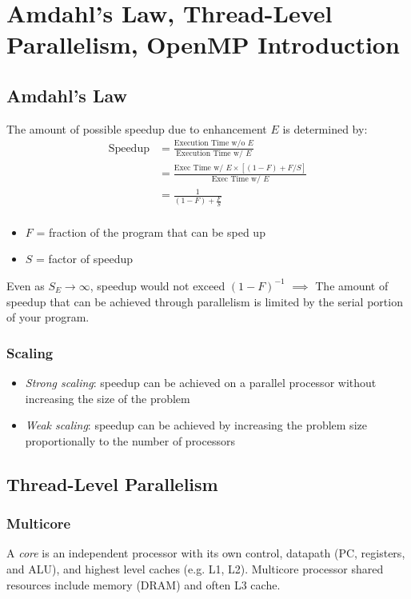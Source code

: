 \chapter{Amdahl's Law, Thread-Level Parallelism, OpenMP Introduction}

\section{Amdahl's Law}
The amount of possible speedup due to enhancement $E$ is determined by:
\begin{align*}
	\text{Speedup} &= \frac{\text{Execution Time w/o $E$}}{\text{Execution Time w/ $E$}} \\
	&= \frac{\text{Exec Time w/ $E$} \times [(1-F) + F/S]}{\text{Exec Time w/ $E$}} \\
	&= \frac{1}{(1-F) + \frac{F}{S}} \\
\end{align*}
\begin{itemize}
    \item $F$ = fraction of the program that can be sped up
    \item $S$ = factor of speedup
\end{itemize}
Even as \(S_E\to\infty\), speedup would not exceed \(\left(1 - F\right)^{-1}\) $\implies$ The amount of speedup that can be achieved through parallelism is limited by the serial portion of your program.

\subsection{Scaling}
\begin{itemize}
    \item \emph{Strong scaling}: speedup can be achieved on a parallel processor without increasing the size of the problem
    \item \emph{Weak scaling}: speedup can be achieved by increasing the problem size proportionally to the number of processors
\end{itemize}


\section{Thread-Level Parallelism}

\subsection{Multicore}
A \emph{core} is an independent processor with its own control, datapath (PC, registers, and ALU), and highest level caches (e.g. L1, L2). Multicore processor shared resources include memory (DRAM) and often L3 cache.



